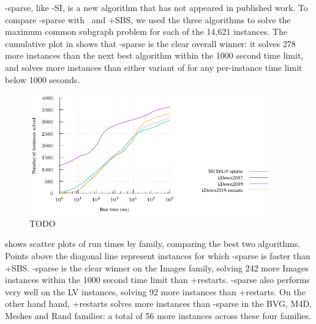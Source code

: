 \McSplit-sparse, like \McSplit-SI, is a new algorithm that
has not appeared in published work.
To compare \McSplit-sparse with \kDown\ and \kDown+SBS,
we used the three algorithms to solve the maximum
common subgraph problem for each of the 14,621 instances.
The cumulative plot in  
shows that \McSplit-sparse is the clear overall winner: it solves
278 more instances than the next best algorithm within the 1000 second
time limit, and solves more instances than either variant of \kDown
for any per-instance time limit below 1000 seconds.

\begin{figure}[htb]
    \centering
    \includegraphics*[width=0.92\textwidth]{14b-mcsplit-induced-si/sip-instances-mcis-experiment/experiment/plots/cumulative.pdf}
    \caption{TODO}
    \label{figure:mcsplit-sparse-cumulative}
\end{figure}

 shows scatter plots
of run times by family, comparing the best two algorithms.  Points
above the diagonal line represent instances for which \McSplit-sparse
is faster than \kDown+SBS. 
\McSplit-sparse is the clear winner on the Images family,
solving 242 more Images instances
within the 1000 second time limit than \kDown+restarts.
\McSplit-sparse also performs very well on the LV instances,
solving 92 more instances than \kDown+restarts.
On the other hand
hand, \kDown+restarts solves more instances than \McSplit-sparse in the
BVG, M4D, Meshes and Rand families: a total of 56 more instances across these
four families.


